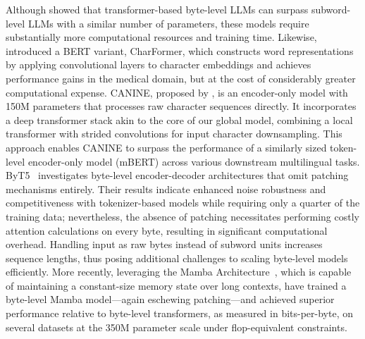 Although \cite{Choe2019BridgingTG} showed that transformer-based byte-level LLMs can surpass subword-level LLMs with a similar number of parameters, these models require substantially more computational resources and training time. Likewise, \cite{el2020characterbert} introduced a BERT variant, CharFormer, which constructs word representations by applying convolutional layers to character embeddings and achieves performance gains in the medical domain, but at the cost of considerably greater computational expense. CANINE, proposed by \cite{clark2022canine}, is an encoder-only model with 150M parameters that processes raw character sequences directly. It incorporates a deep transformer stack akin to the core of our global model, combining a local transformer with strided convolutions for input character downsampling. This approach enables CANINE to surpass the performance of a similarly sized token-level encoder-only model (mBERT) across various downstream multilingual tasks. ByT5~\citep{xue2022byt5} investigates byte-level encoder-decoder architectures that omit patching mechanisms entirely. Their results indicate enhanced noise robustness and competitiveness with tokenizer-based models while requiring only a quarter of the training data; nevertheless, the absence of patching necessitates performing costly attention calculations on every byte, resulting in significant computational overhead. Handling input as raw bytes instead of subword units increases sequence lengths, thus posing additional challenges to scaling byte-level models efficiently. More recently, leveraging the Mamba Architecture~\citep{gu2023mamba}, which is capable of maintaining a constant-size memory state over long contexts, \cite{wang2024mambabyte} have trained a byte-level Mamba model—again eschewing patching—and achieved superior performance relative to byte-level transformers, as measured in bits-per-byte, on several datasets at the 350M parameter scale under flop-equivalent constraints.

